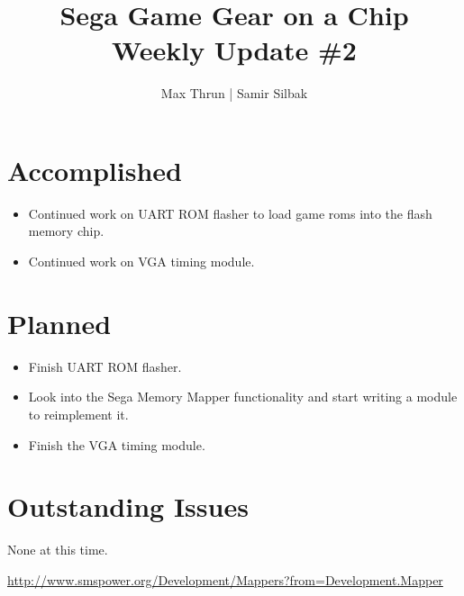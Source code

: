 \documentclass[12pt]{article}
\title{Sega Game Gear on a Chip \\ Weekly Update \#2}
\author{ Max Thrun | Samir Silbak }
\begin{document}
\maketitle

\section*{Accomplished}
\begin{itemize}
    \item Continued work on UART ROM flasher to load game roms into the flash memory chip.
    \item Continued work on VGA timing module.
\end{itemize}

\section*{Planned}
\begin{itemize}
    \item Finish UART ROM flasher.
    \item Look into the Sega Memory Mapper\cite{mapper} functionality and start writing a module to reimplement it.
    \item Finish the VGA timing  module.
\end{itemize}

\section*{Outstanding Issues}
None at this time.

\vspace{.1in}
\begin{thebibliography}{9}
     \url{http://www.smspower.org/Development/Mappers?from=Development.Mapper}
\end{thebibliography}
\end{document}
